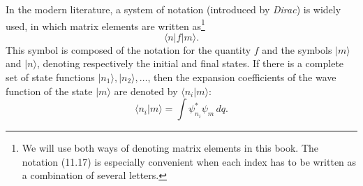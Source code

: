 In the modern literature, a system of notation (introduced by
\textit{Dirac}) is widely used, in which matrix elements are written as\footnote{We
will use both ways of denoting matrix elements in this book. The notation
(11.17) is especially convenient when each index has to be written as a
combination of several letters.}
\begin{equation}
  \langle n|f|m\rangle.
  \tag{11.17}
\end{equation}
This symbol is composed of the notation for the quantity $f$ and the symbols
$|m\rangle$ and
$|n\rangle$, denoting respectively the initial and final states. If
there is a complete set of state functions $|n_1\rangle,|n_2\rangle,\ldots$, then
the expansion coefficients of the wave function of the state $|m\rangle$ are
denoted by $\langle n_i|m\rangle$:
\begin{equation}
  \langle n_i|m\rangle=\int\psi_{n_i}^*\psi_m\,dq.
  \tag{11.18}
\end{equation}